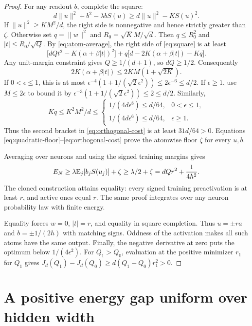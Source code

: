 \begin{proof}
For any readout $b$, complete the square:
\begin{equation}\label{eq:square}
 d\|u\|^2+b^2-\lambda bS(u)
 \ge d\|u\|^2-KS(u)^2.
\end{equation}
If $\|u\|^2\ge KM^2/d$, the right side is nonnegative and hence
strictly greater than $\zeta$. Otherwise set $q=\|w\|^2$ and
$R_0=\sqrt K M/\sqrt d$. Then $q\le R_0^2$ and
$|t|\le R_0/\sqrt Q$. By \eqref{eq:atom-average}, the right side of
\eqref{eq:square} is at least
\begin{equation}\label{eq:orthogonal-cost}
 \bigl[dQt^2-K(\alpha+\beta|t|)^2\bigr]
 +q\bigl[d-2K(\alpha+\beta|t|)-Kq\bigr].
\end{equation}
Any unit-margin constraint gives $Q\ge1/(d+1)$, so $dQ\ge1/2$.
Consequently
\[
 2K(\alpha+\beta|t|)\le2KM(1+\sqrt{2K}).
\]
If $0<\epsilon\le1$, this is at most
$\epsilon^{-4}(1+1/(\sqrt2\epsilon^2))\le2\epsilon^{-6}\le d/2$.
If $\epsilon\ge1$, use $M\le2\epsilon$ to bound it by
$\epsilon^{-3}(1+1/(\sqrt2\epsilon^2))\le2\le d/2$.
Similarly,
\[
 Kq\le K^2M^2/d\le
 \begin{cases}
 1/(4d\epsilon^8)\le d/64,&0<\epsilon\le1,\\
 1/(4d\epsilon^6)\le d/64,&\epsilon\ge1.
 \end{cases}
\]
Thus the second bracket in \eqref{eq:orthogonal-cost} is at least
$31d/64>0$. Equations \eqref{eq:quadratic-floor}--\eqref{eq:orthogonal-cost}
prove the atomwise floor $\zeta$ for every $u,b$.

Averaging over neurons and using the signed training margins gives
\[
 E_N\ge\lambda\mathbb E_j[b_jS(u_j)]+\zeta
      \ge\lambda/2+\zeta
      =dQr^2+\frac1{4h^2}.
\]
The cloned construction attains equality: every signed training
preactivation is at least $r$, and active ones equal $r$.
The same proof integrates over any neuron probability law with finite
energy.

Equality forces $w=0$, $|t|=r$, and equality in square completion.
Thus $u=\pm ra$ and $b=\pm1/(2h)$ with matching signs.
Oddness of the activation makes all such atoms have the same output.
Finally, the negative derivative at zero puts the optimum below
$1/(4\epsilon^2)$. For $Q_1>Q_0$, evaluation at the positive
minimizer $r_1$ for $Q_1$ gives
$J_d(Q_1)-J_d(Q_0)\ge d(Q_1-Q_0)r_1^2>0$.
\end{proof}

\section{A positive energy gap uniform over hidden width}


